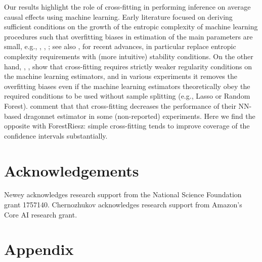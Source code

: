 \documentclass[nohyperref]{article}
\theoremstyle{plain}
\theoremstyle{definition}
\theoremstyle{remark}
\begin{document}
Our results highlight the role of cross-fitting in performing inference on average causal effects using machine learning. Early literature focused on deriving sufficient conditions on the growth of the entropic complexity of machine learning procedures such that overfitting biases in estimation of the main parameters are small, e.g., \citet{belloni2012sparse}, \citet{belloni2014uniform}, \citet{belloni2017program, belloni2018:Z}; see also \citet{farrell2021deep}, \citet{chen2022debiased} for recent advances, in particular \citet{chen2022debiased} replace entropic complexity requirements with (more intuitive) stability conditions. 
On the other hand,  \citet{belloni2012sparse}, \citet{chernozhukov2018double}, \citet{newey2018cross} show that cross-fitting requires strictly weaker regularity conditions on the machine learning estimators, and in various experiments it removes the overfitting biases even if the machine learning estimators theoretically obey the required conditions to be used without sample splitting (e.g.,  Lasso or Random Forest). \citet{shi2019adapting} comment that that cross-fitting decreases the performance of their NN-based dragonnet estimator in some (non-reported) experiments.
Here we find the opposite with ForestRiesz: simple  cross-fitting tends to improve coverage of the confidence intervals substantially.

\section*{Acknowledgements}
Newey acknowledges research support from the National Science Foundation grant 1757140. Chernozhukov acknowledges research support from Amazon's Core AI research grant.





\newpage
\appendix
\onecolumn
\section{Appendix}
\setcounter{table}{0}
\renewcommand{\thetable}{A\arabic{table}}
\setcounter{figure}{0}
\renewcommand{\thefigure}{A\arabic{figure}}
\end{document}
